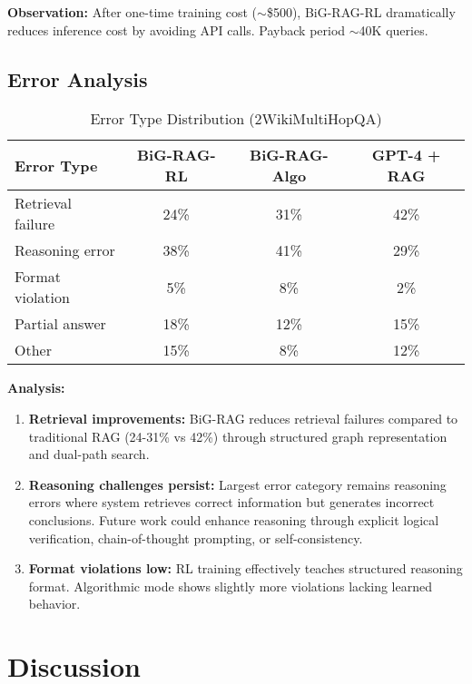 \documentclass[11pt,a4paper]{article}
\begin{document}
\textbf{Observation:} After one-time training cost ($\sim$\$500), BiG-RAG-RL dramatically reduces inference cost by avoiding API calls. Payback period $\sim$40K queries.

\subsection{Error Analysis}

\begin{table}[h]
\centering
\caption{Error Type Distribution (2WikiMultiHopQA)}
\begin{tabular}{lccc}
\toprule
\textbf{Error Type} & \textbf{BiG-RAG-RL} & \textbf{BiG-RAG-Algo} & \textbf{GPT-4 + RAG} \\
\midrule
Retrieval failure & 24\% & 31\% & 42\% \\
Reasoning error & 38\% & 41\% & 29\% \\
Format violation & 5\% & 8\% & 2\% \\
Partial answer & 18\% & 12\% & 15\% \\
Other & 15\% & 8\% & 12\% \\
\bottomrule
\end{tabular}
\end{table}

\textbf{Analysis:}

\begin{enumerate}
    \item \textbf{Retrieval improvements:} BiG-RAG reduces retrieval failures compared to traditional RAG (24-31\% vs 42\%) through structured graph representation and dual-path search.

    \item \textbf{Reasoning challenges persist:} Largest error category remains reasoning errors where system retrieves correct information but generates incorrect conclusions. Future work could enhance reasoning through explicit logical verification, chain-of-thought prompting, or self-consistency.

    \item \textbf{Format violations low:} RL training effectively teaches structured reasoning format. Algorithmic mode shows slightly more violations lacking learned behavior.
\end{enumerate}

\section{Discussion}
\end{document}

